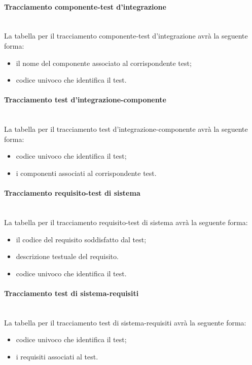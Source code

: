 \paragraph{Tracciamento componente-test d'integrazione} \hfill \\
La tabella per il tracciamento componente-test d'integrazione avrà la seguente forma:
\begin{itemize}
\item {} il nome del componente associato al corrispondente test;
\item {}codice univoco che identifica il test.
\end{itemize}

\paragraph{Tracciamento test d'integrazione-componente} \hfill \\
La tabella per il tracciamento test d'integrazione-componente avrà la seguente forma:
\begin{itemize}
\item {}codice univoco che identifica il test;
\item {} i componenti associati al corrispondente test.
\end{itemize}


\paragraph{Tracciamento requisito-test di sistema} \hfill \\
La tabella per il tracciamento requisito-test di sistema avrà la seguente forma:
\begin{itemize}
\item {} il codice del requisito soddisfatto dal test;
\item {} descrizione testuale del requisito.
\item {}codice univoco che identifica il test.
\end{itemize}

\paragraph{Tracciamento test di sistema-requisiti} \hfill \\
La tabella per il tracciamento test di sistema-requisiti avrà la seguente forma:
\begin{itemize}
\item {}codice univoco che identifica il test;
\item {} i requisiti associati al test.
\end{itemize}


